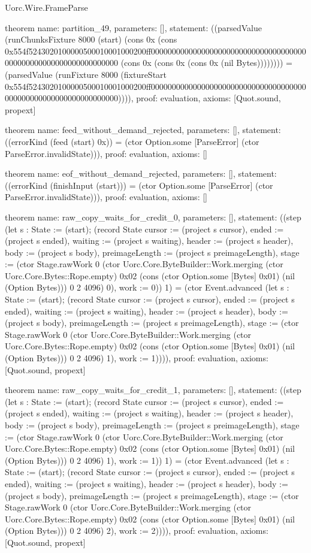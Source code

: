 \begin{lexlean}{Uorc.Wire.FrameParse}
\begin{semanticmodule}
theorem{
  name: partition_49,
  parameters: [],
  statement: ((parsedValue (runChunksFixture 8000 (start) (cons 0x (cons 0x554f5243020100000500010001000200ff0000000000000000000000000000000000000000000000000000000000000000 (cons 0x (cons 0x (cons 0x (nil Bytes)))))))) = (parsedValue (runFixture 8000 (fixtureStart 0x554f5243020100000500010001000200ff0000000000000000000000000000000000000000000000000000000000000000)))),
  proof: evaluation{},
  axioms: [Quot.sound, propext]
}

theorem{
  name: feed_without_demand_rejected,
  parameters: [],
  statement: ((errorKind (feed (start) 0x)) = (ctor Option.some [ParseError] (ctor ParseError.invalidState))),
  proof: evaluation{},
  axioms: []
}

theorem{
  name: eof_without_demand_rejected,
  parameters: [],
  statement: ((errorKind (finishInput (start))) = (ctor Option.some [ParseError] (ctor ParseError.invalidState))),
  proof: evaluation{},
  axioms: []
}

theorem{
  name: raw_copy_waits_for_credit_0,
  parameters: [],
  statement: ((step (let s : State := (start); (record State {cursor := (project s cursor), ended := (project s ended), waiting := (project s waiting), header := (project s header), body := (project s body), preimageLength := (project s preimageLength), stage := (ctor Stage.rawWork 0 (ctor Uorc.Core.ByteBuilder::Work.merging (ctor Uorc.Core.Bytes::Rope.empty) 0x02 (cons (ctor Option.some [Bytes] 0x01) (nil (Option Bytes))) 0 2 4096) 0), work := 0})) 1) = (ctor Event.advanced (let s : State := (start); (record State {cursor := (project s cursor), ended := (project s ended), waiting := (project s waiting), header := (project s header), body := (project s body), preimageLength := (project s preimageLength), stage := (ctor Stage.rawWork 0 (ctor Uorc.Core.ByteBuilder::Work.merging (ctor Uorc.Core.Bytes::Rope.empty) 0x02 (cons (ctor Option.some [Bytes] 0x01) (nil (Option Bytes))) 0 2 4096) 1), work := 1})))),
  proof: evaluation{},
  axioms: [Quot.sound, propext]
}

theorem{
  name: raw_copy_waits_for_credit_1,
  parameters: [],
  statement: ((step (let s : State := (start); (record State {cursor := (project s cursor), ended := (project s ended), waiting := (project s waiting), header := (project s header), body := (project s body), preimageLength := (project s preimageLength), stage := (ctor Stage.rawWork 0 (ctor Uorc.Core.ByteBuilder::Work.merging (ctor Uorc.Core.Bytes::Rope.empty) 0x02 (cons (ctor Option.some [Bytes] 0x01) (nil (Option Bytes))) 0 2 4096) 1), work := 1})) 1) = (ctor Event.advanced (let s : State := (start); (record State {cursor := (project s cursor), ended := (project s ended), waiting := (project s waiting), header := (project s header), body := (project s body), preimageLength := (project s preimageLength), stage := (ctor Stage.rawWork 0 (ctor Uorc.Core.ByteBuilder::Work.merging (ctor Uorc.Core.Bytes::Rope.empty) 0x02 (cons (ctor Option.some [Bytes] 0x01) (nil (Option Bytes))) 0 2 4096) 2), work := 2})))),
  proof: evaluation{},
  axioms: [Quot.sound, propext]
}


\end{semanticmodule}
\end{lexlean}
